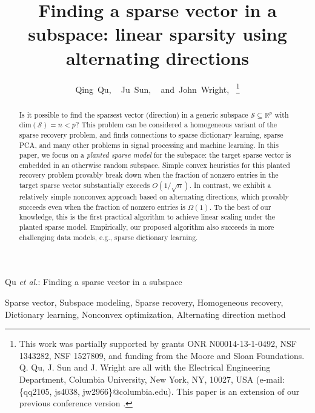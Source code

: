 \documentclass[11pt, journal, final]{IEEEtran}
\numberwithin{equation}{section}
\newcommand{\R}{\mathbb{R}}
\newcommand{ \paren }[1]{ \left( #1 \right) }
\begin{document}
{

\title{Finding a sparse vector in a subspace: linear sparsity using alternating directions}

\author{Qing~Qu, ~
				Ju~Sun, ~
				and~John~Wright,~
        \thanks{This work was partially supported by grants ONR N00014-13-1-0492, NSF 1343282, NSF 1527809, and funding from the Moore and Sloan Foundations. Q. Qu, J. Sun and J. Wright are all with the Electrical Engineering Department, Columbia University, New York, NY, 10027, USA (e-mail: \{qq2105, js4038, jw2966\}@columbia.edu). This paper is an extension of our previous conference version \cite{qu2014finding}.
}
}

{Qu \MakeLowercase{\textit{et al.}}: Finding a sparse vector in a subspace}

\maketitle

\begin{abstract}

Is it possible to find the sparsest vector (direction) in a generic subspace $\mathcal{S} \subseteq \R^p$ with $\text{dim}\paren{\mathcal{S}}=n < p$? This problem can be considered a homogeneous variant of the sparse recovery problem, and finds connections to sparse dictionary learning, sparse PCA, and many other problems in signal processing and machine learning. In this paper, we focus on a \emph{planted sparse model} for the subspace: the target sparse vector is embedded in an otherwise random subspace. Simple convex heuristics for this planted recovery problem provably break down when the fraction of nonzero entries in the target sparse vector substantially exceeds $O(1/\sqrt{n})$. In contrast, we exhibit a relatively simple nonconvex approach based on alternating directions, which provably succeeds even when the fraction of nonzero entries is $\Omega(1)$. To the best of our knowledge, this is the first practical algorithm to achieve linear scaling under the planted sparse model. Empirically, our proposed algorithm also succeeds in more challenging data models, e.g., sparse dictionary learning.
\end{abstract}

\begin{IEEEkeywords}
Sparse vector, Subspace modeling, Sparse recovery, Homogeneous recovery, Dictionary learning, Nonconvex optimization, Alternating direction method
\end{IEEEkeywords}

}
\end{document}
